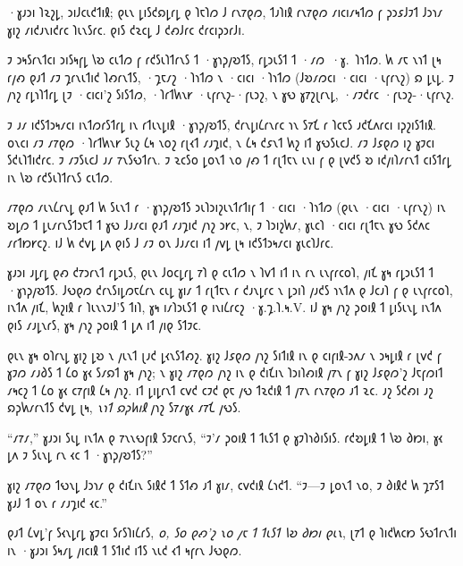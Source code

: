 ·𐑣𐑨𐑮𐑦 𐑐𐑷𐑟𐑛, 𐑮𐑦𐑓𐑤𐑧𐑒𐑑𐑦𐑙; 𐑞𐑧𐑯 𐑛𐑦𐑕𐑒𐑸𐑛𐑩𐑛 𐑞 𐑐𐑱𐑐𐑼 𐑓 𐑩𐑯𐑳𐑞𐑼, 𐑑𐑨𐑐𐑦𐑙 𐑩𐑯𐑳𐑞𐑼 𐑥𐑦𐑤𐑦𐑥𐑰𐑑𐑼 𐑝 𐑜𐑮𐑭𐑓𐑲𐑑 𐑓𐑮𐑪𐑥 𐑣𐑦𐑟 𐑥𐑦𐑒𐑨𐑯𐑦𐑒𐑩𐑤 𐑐𐑧𐑯𐑕𐑩𐑤. 𐑞𐑦𐑕 𐑒𐑷𐑤𐑛 𐑓 𐑒𐑺𐑓𐑩𐑤 𐑒𐑩𐑤𐑦𐑜𐑮𐑩𐑓𐑦.

\begin{writtenNote}


𐑲 𐑮𐑰𐑕𐑩𐑯𐑑𐑤𐑦 𐑮𐑦𐑕𐑰𐑝𐑛 𐑘𐑹 𐑤𐑧𐑑𐑼 𐑝 𐑩𐑒𐑕𐑧𐑐𐑑𐑩𐑯𐑕 𐑑 ·𐑣𐑪𐑜𐑢𐑹𐑑𐑕, 𐑩𐑛𐑮𐑧𐑕𐑑 𐑑 ·𐑥𐑼~·𐑣.~𐑐𐑪𐑑𐑼. 𐑿 𐑥𐑱 𐑯𐑪𐑑 𐑚𐑰 𐑩𐑢𐑺 𐑞𐑨𐑑 𐑥𐑲 𐑡𐑩𐑯𐑧𐑑𐑦𐑒 𐑐𐑺𐑩𐑯𐑑𐑕, ·𐑡𐑱𐑥𐑟 ·𐑐𐑪𐑑𐑼 𐑯 ·𐑤𐑦𐑤𐑦 ·𐑐𐑪𐑑𐑼 (𐑓𐑹𐑥𐑼𐑤𐑦 ·𐑤𐑦𐑤𐑦 ·𐑧𐑝𐑩𐑯𐑟) 𐑸 𐑛𐑧𐑛. 𐑲 𐑢𐑪𐑟 𐑩𐑛𐑪𐑐𐑑𐑩𐑛 𐑚𐑲 ·𐑤𐑦𐑤𐑦'𐑟 𐑕𐑦𐑕𐑑𐑼, ·𐑐𐑩𐑑𐑿𐑯𐑾 ·𐑧𐑝𐑩𐑯𐑟-·𐑝𐑧𐑮𐑟, 𐑯 𐑣𐑻 𐑣𐑳𐑟𐑚𐑩𐑯𐑛, ·𐑥𐑲𐑒𐑩𐑤 ·𐑝𐑧𐑮𐑟-·𐑧𐑝𐑩𐑯𐑟.

𐑲 𐑨𐑥 𐑦𐑒𐑕𐑑𐑮𐑰𐑥𐑤𐑦 𐑦𐑯𐑑𐑼𐑩𐑕𐑑𐑩𐑛 𐑦𐑯 𐑩𐑑𐑧𐑯𐑛𐑦𐑙 ·𐑣𐑪𐑜𐑢𐑹𐑑𐑕, 𐑒𐑩𐑯𐑛𐑦𐑖𐑩𐑯𐑩𐑤 𐑪𐑯 𐑕𐑳𐑗 𐑩 𐑐𐑤𐑱𐑕 𐑨𐑒𐑗𐑵𐑩𐑤𐑦 𐑦𐑜𐑟𐑦𐑕𐑑𐑦𐑙. 𐑴𐑯𐑤𐑦 𐑥𐑲 𐑥𐑳𐑞𐑼 ·𐑐𐑩𐑑𐑿𐑯𐑾 𐑕𐑧𐑟 𐑖𐑰 𐑯𐑴𐑟 𐑩𐑚𐑬𐑑 𐑥𐑨𐑡𐑦𐑒, 𐑯 𐑖𐑰 𐑒𐑭𐑯𐑑 𐑿𐑟 𐑦𐑑 𐑣𐑻𐑕𐑧𐑤𐑓. 𐑥𐑲 𐑓𐑭𐑞𐑼 𐑦𐑟 𐑣𐑲𐑤𐑦 𐑕𐑒𐑧𐑐𐑑𐑦𐑒𐑩𐑤. 𐑲 𐑥𐑲𐑕𐑧𐑤𐑓 𐑨𐑥 𐑳𐑯𐑕𐑻𐑑𐑩𐑯. 𐑲 𐑷𐑤𐑕𐑴 𐑛𐑴𐑯𐑑 𐑯𐑴 𐑢𐑺 𐑑 𐑩𐑚𐑑𐑱𐑯 𐑧𐑯𐑦 𐑝 𐑞 𐑚𐑫𐑒𐑕 𐑹 𐑦𐑒𐑢𐑦𐑐𐑥𐑩𐑯𐑑 𐑤𐑦𐑕𐑑𐑩𐑛 𐑦𐑯 𐑘𐑹 𐑩𐑒𐑕𐑧𐑐𐑑𐑩𐑯𐑕 𐑤𐑧𐑑𐑼.

𐑥𐑳𐑞𐑼 𐑥𐑧𐑯𐑖𐑩𐑯𐑛 𐑞𐑨𐑑 𐑿 𐑕𐑧𐑯𐑑 𐑩 ·𐑣𐑪𐑜𐑢𐑹𐑑𐑕 𐑮𐑧𐑐𐑮𐑦𐑟𐑧𐑯𐑑𐑩𐑑𐑦𐑝 𐑑 ·𐑤𐑦𐑤𐑦 ·𐑐𐑪𐑑𐑼 (𐑞𐑧𐑯 ·𐑤𐑦𐑤𐑦 ·𐑧𐑝𐑩𐑯𐑟) 𐑦𐑯 𐑹𐑛𐑼 𐑑 𐑛𐑧𐑥𐑩𐑯𐑕𐑑𐑮𐑱𐑑 𐑑 𐑣𐑻 𐑓𐑨𐑥𐑤𐑦 𐑞𐑨𐑑 𐑥𐑨𐑡𐑦𐑒 𐑢𐑪𐑟 𐑮𐑾𐑤, 𐑯, 𐑲 𐑐𐑮𐑦𐑟𐑿𐑥, 𐑣𐑧𐑤𐑐 ·𐑤𐑦𐑤𐑦 𐑩𐑚𐑑𐑱𐑯 𐑣𐑻 𐑕𐑒𐑵𐑤 𐑥𐑩𐑑𐑽𐑾𐑤𐑟. 𐑦𐑓 𐑿 𐑒𐑫𐑛 𐑛𐑵 𐑞𐑦𐑕 𐑓 𐑥𐑲 𐑴𐑯 𐑓𐑨𐑥𐑤𐑦 𐑦𐑑 𐑢𐑫𐑛 𐑚𐑰 𐑦𐑒𐑕𐑑𐑮𐑰𐑥𐑤𐑦 𐑣𐑧𐑤𐑐𐑓𐑩𐑤.

\end{writtenNote}

𐑣𐑨𐑮𐑦 𐑨𐑛𐑩𐑛 𐑞𐑺 𐑒𐑳𐑮𐑩𐑯𐑑 𐑩𐑛𐑮𐑧𐑕, 𐑞𐑧𐑯 𐑓𐑴𐑤𐑛𐑩𐑛 𐑳𐑐 𐑞 𐑤𐑧𐑑𐑼 𐑯 𐑐𐑫𐑑 𐑦𐑑 𐑦𐑯 𐑩𐑯 𐑧𐑯𐑝𐑩𐑤𐑴𐑐, 𐑢𐑦𐑗 𐑣𐑰 𐑩𐑛𐑮𐑧𐑕𐑑 𐑑 ·𐑣𐑪𐑜𐑢𐑹𐑑𐑕. 𐑓𐑻𐑞𐑼 𐑒𐑩𐑯𐑕𐑦𐑛𐑼𐑱𐑖𐑩𐑯 𐑤𐑧𐑛 𐑣𐑦𐑥 𐑑 𐑩𐑚𐑑𐑱𐑯 𐑩 𐑒𐑨𐑯𐑛𐑩𐑤 𐑯 𐑛𐑮𐑦𐑐 𐑢𐑨𐑒𐑕 𐑪𐑯𐑑𐑵 𐑞 𐑓𐑤𐑨𐑐 𐑝 𐑞 𐑧𐑯𐑝𐑩𐑤𐑴𐑐, 𐑦𐑯𐑑𐑵 𐑢𐑦𐑗, 𐑿𐑟𐑦𐑙 𐑩 𐑐𐑧𐑯𐑯𐑲𐑓'𐑕 𐑑𐑦𐑐, 𐑣𐑰 𐑦𐑥𐑐𐑮𐑧𐑕𐑑 𐑞 𐑦𐑯𐑦𐑖𐑩𐑤𐑟 ·𐑣.𐑡.𐑐.𐑰.V\@. 𐑦𐑓 𐑣𐑰 𐑢𐑪𐑟 𐑜𐑴𐑦𐑙 𐑑 𐑛𐑦𐑕𐑧𐑯𐑛 𐑦𐑯𐑑𐑵 𐑞𐑦𐑕 𐑥𐑨𐑛𐑯𐑩𐑕, 𐑣𐑰 𐑢𐑪𐑟 𐑜𐑴𐑦𐑙 𐑑 𐑛𐑵 𐑦𐑑 𐑢𐑦𐑞 𐑕𐑑𐑲𐑤.

𐑞𐑧𐑯 𐑣𐑰 𐑴𐑐𐑩𐑯𐑛 𐑣𐑦𐑟 𐑛𐑹 𐑯 𐑢𐑧𐑯𐑑 𐑚𐑨𐑒 𐑛𐑬𐑯𐑕𐑑𐑺𐑟. 𐑣𐑦𐑟 𐑓𐑭𐑞𐑼 𐑢𐑪𐑟 𐑕𐑦𐑑𐑦𐑙 𐑦𐑯 𐑞 𐑤𐑦𐑝𐑦𐑙-𐑮𐑵𐑥 𐑯 𐑮𐑰𐑛𐑦𐑙 𐑩 𐑚𐑫𐑒 𐑝 𐑣𐑲𐑼 𐑥𐑨𐑔𐑕 𐑑 𐑖𐑴 𐑣𐑬 𐑕𐑥𐑸𐑑 𐑣𐑰 𐑢𐑪𐑟; 𐑯 𐑣𐑦𐑟 𐑥𐑳𐑞𐑼 𐑢𐑪𐑟 𐑦𐑯 𐑞 𐑒𐑦𐑗𐑦𐑯 𐑐𐑮𐑦𐑐𐑺𐑦𐑙 𐑢𐑳𐑯 𐑝 𐑣𐑦𐑟 𐑓𐑭𐑞𐑼'𐑟 𐑓𐑱𐑝𐑼𐑦𐑑 𐑥𐑰𐑤𐑟 𐑑 𐑖𐑴 𐑣𐑬 𐑤𐑳𐑝𐑦𐑙 𐑖𐑰 𐑢𐑪𐑟. 𐑦𐑑 𐑛𐑦𐑛𐑩𐑯𐑑 𐑤𐑫𐑒 𐑤𐑲𐑒 𐑞𐑱 𐑢𐑻 𐑑𐑷𐑒𐑦𐑙 𐑑 𐑢𐑳𐑯 𐑩𐑯𐑳𐑞𐑼 𐑨𐑑 𐑷𐑤. 𐑨𐑟 𐑕𐑒𐑺𐑦 𐑨𐑟 𐑸𐑜𐑿𐑥𐑩𐑯𐑑𐑕 𐑒𐑫𐑛 𐑚𐑰, \emph{𐑯𐑪𐑑 𐑸𐑜𐑿𐑦𐑙} 𐑢𐑪𐑟 𐑕𐑳𐑥𐑣𐑬 𐑥𐑳𐑗 𐑢𐑻𐑕.

“𐑥𐑳𐑥,” 𐑣𐑨𐑮𐑦 𐑕𐑧𐑛 𐑦𐑯𐑑𐑵 𐑞 𐑳𐑯𐑯𐑻𐑝𐑦𐑙 𐑕𐑲𐑤𐑩𐑯𐑕, “𐑲'𐑥 𐑜𐑴𐑦𐑙 𐑑 𐑑𐑧𐑕𐑑 𐑞 𐑣𐑲𐑐𐑪𐑔𐑦𐑕𐑦𐑕. 𐑩𐑒𐑹𐑛𐑦𐑙 𐑑 𐑘𐑹 𐑔𐑽𐑦, 𐑣𐑬 𐑛𐑵 𐑲 𐑕𐑧𐑯𐑛 𐑩𐑯 𐑬𐑤 𐑑 ·𐑣𐑪𐑜𐑢𐑹𐑑𐑕?”

𐑣𐑦𐑟 𐑥𐑳𐑞𐑼 𐑑𐑻𐑯𐑛 𐑓𐑮𐑪𐑥 𐑞 𐑒𐑦𐑗𐑦𐑯 𐑕𐑦𐑙𐑒 𐑑 𐑕𐑑𐑺 𐑨𐑑 𐑣𐑦𐑥, 𐑤𐑫𐑒𐑦𐑙 𐑖𐑪𐑒𐑑. “𐑲—𐑲 𐑛𐑴𐑯𐑑 𐑯𐑴, 𐑲 𐑔𐑦𐑙𐑒 𐑿 𐑡𐑳𐑕𐑑 𐑣𐑨𐑓 𐑑 𐑴𐑯 𐑩 𐑥𐑨𐑡𐑦𐑒 𐑬𐑤.”

𐑞𐑨𐑑 𐑖𐑫𐑛'𐑝 𐑕𐑬𐑯𐑛𐑩𐑛 𐑣𐑲𐑤𐑦 𐑕𐑩𐑕𐑐𐑦𐑖𐑩𐑕, \emph{𐑴, 𐑕𐑴 𐑞𐑺'𐑟 𐑯𐑴 𐑢𐑱 𐑑 𐑑𐑧𐑕𐑑 𐑘𐑹 𐑔𐑽𐑦 𐑞𐑧𐑯}, 𐑚𐑳𐑑 𐑞 𐑐𐑦𐑒𐑿𐑤𐑽 𐑕𐑻𐑑𐑩𐑯𐑑𐑦 𐑦𐑯 ·𐑣𐑨𐑮𐑦 𐑕𐑰𐑥𐑛 𐑢𐑦𐑤𐑦𐑙 𐑑 𐑕𐑑𐑦𐑒 𐑦𐑑𐑕 𐑯𐑧𐑒 𐑬𐑑 𐑰𐑝𐑩𐑯 𐑓𐑻𐑞𐑼.

